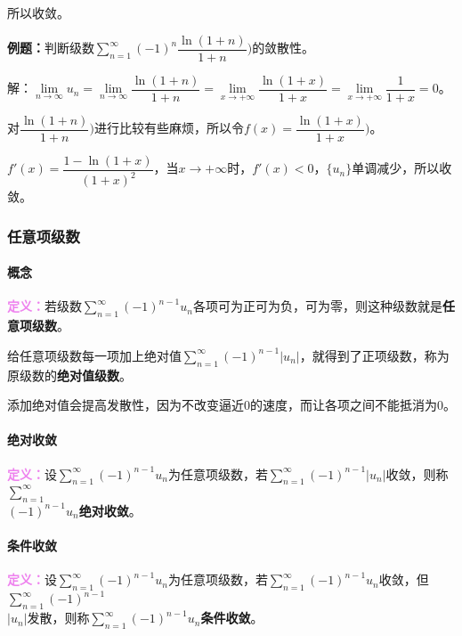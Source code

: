 \documentclass[UTF8, 12pt]{ctexart}
\begin{document}
        所以收敛。

        \textbf{例题：}判断级数$\sum\limits_{n=1}^\infty(-1)^n\dfrac{\ln(1+n)}{1+n})$的敛散性。

        解：$\lim\limits_{n\to\infty}u_n=\lim\limits_{n\to\infty}\dfrac{\ln(1+n)}{1+n}=\lim\limits_{x\to+\infty}\dfrac{\ln(1+x)}{1+x}=\lim\limits_{x\to+\infty}\dfrac{1}{1+x}=0$。

        对$\dfrac{\ln(1+n)}{1+n})$进行比较有些麻烦，所以令$f(x)=\dfrac{\ln(1+x)}{1+x})$。

        $f'(x)=\dfrac{1-\ln(1+x)}{(1+x)^2}$，当$x\to+\infty$时，$f'(x)<0$，$\{u_n\}$单调减少，所以收敛。

        \subsubsection{任意项级数}

        \paragraph{概念} \leavevmode \medskip

        \textcolor{violet}{\textbf{定义：}}若级数$\sum\limits_{n=1}^\infty(-1)^{n-1}u_n$各项可为正可为负，可为零，则这种级数就是\textbf{任意项级数}。

        给任意项级数每一项加上绝对值$\sum\limits_{n=1}^\infty(-1)^{n-1}\vert u_n\vert$，就得到了正项级数，称为原级数的\textbf{绝对值级数}。

        添加绝对值会提高发散性，因为不改变逼近0的速度，而让各项之间不能抵消为0。

        \paragraph{绝对收敛} \leavevmode \medskip

        \textcolor{violet}{\textbf{定义：}}设$\sum\limits_{n=1}^\infty(-1)^{n-1}u_n$为任意项级数，若$\sum\limits_{n=1}^\infty(-1)^{n-1}\vert u_n\vert$收敛，则称$\sum\limits_{n=1}^\infty$\\$(-1)^{n-1}u_n$\textbf{绝对收敛}。

        \paragraph{条件收敛} \leavevmode \medskip

        \textcolor{violet}{\textbf{定义：}}设$\sum\limits_{n=1}^\infty(-1)^{n-1}u_n$为任意项级数，若$\sum\limits_{n=1}^\infty(-1)^{n-1}u_n$收敛，但$\sum\limits_{n=1}^\infty(-1)^{n-1}$\\$\vert u_n\vert$发散，则称$\sum\limits_{n=1}^\infty(-1)^{n-1}u_n$\textbf{条件收敛}。
\end{document}
